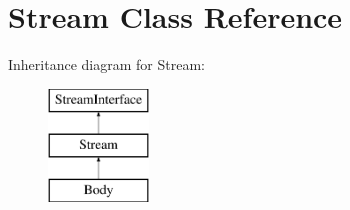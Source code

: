 \hypertarget{class_pes_1_1_http_1_1_stream}{}\section{Stream Class Reference}
\label{class_pes_1_1_http_1_1_stream}
Inheritance diagram for Stream\+:\begin{figure}[H]
\begin{center}
\leavevmode
\includegraphics[height=3.000000cm]{class_pes_1_1_http_1_1_stream}
\end{center}
\end{figure}
